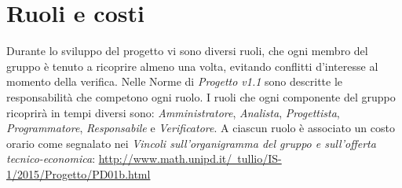 \section{Ruoli e costi}
Durante lo sviluppo del progetto vi sono diversi ruoli, che ogni membro del gruppo è tenuto a ricoprire almeno una volta, evitando conflitti d’interesse al momento della verifica. Nelle Norme di \textit{Progetto v1.1} sono descritte le responsabilità che competono ogni ruolo. I ruoli che ogni componente del gruppo ricoprirà in tempi diversi sono: \textit{Amministratore}, \textit{Analista}, \textit{Progettista}, \textit{Programmatore}, \textit{Responsabile} e \textit{Verificatore}.
A ciascun ruolo è associato un costo orario come segnalato nei \textit{Vincoli sull’organigramma del gruppo e sull’offerta tecnico-economica}:
\href{http://www.math.unipd.it/~tullio/IS-1/2015/Progetto/PD01b.html}{http://www.math.unipd.it/~tullio/IS-1/2015/Progetto/PD01b.html}
